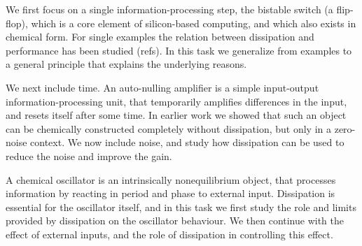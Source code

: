 \begin{workpackage}[id=WPdissipation,wphases=0-48,
short=Dissipation,
title=Harnessing dissipation,
lead=TUE,
TUERM=36]
\begin{wpdescription}
%
%

\end{wpdescription}


\begin{tasklist}


  \begin{task}[title=Dissipation in the bistable switch]
  We first focus on a single information-processing step, the bistable switch (a flip-flop), which is a core element of silicon-based computing, and which also exists in chemical form. For single examples the relation between dissipation and performance has been studied (refs). In this task we generalize from examples to a general principle that explains the underlying reasons.
  \end{task}

  \begin{task}[title=Role of dissipation in time]
  We next include time. An auto-nulling amplifier is a simple input-output information-processing unit, that temporarily amplifies differences in the input, and resets itself after some time. In earlier work we showed that such an object can be chemically constructed completely without dissipation, but only in a zero-noise context. We now include noise, and study how dissipation can be used to reduce the noise and improve the gain.  \end{task}
  
  \begin{task}[title=Dissipation in an oscillator]
A chemical oscillator is an intrinsically nonequilibrium object, that processes information by reacting in period and phase to external input. Dissipation is essential for the oscillator itself, and in this task we first study the role and limits provided by dissipation on the oscillator behaviour. We then continue with the effect of external inputs, and the role of dissipation in controlling this effect.    \end{task}
  

\end{tasklist}


\end{workpackage}
